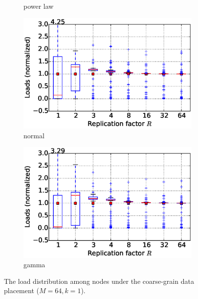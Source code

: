 \begin{figure}[!htbp]
\begin{subfigure}[b]{0.45\textwidth}
    \caption{power law}
\end{subfigure}
\begin{subfigure}[b]{0.45\textwidth}
    \includegraphics[width=\linewidth]{figures/E45_simulation_imbalance_coarse_std_normal.eps}
    \caption{normal}
\end{subfigure}
\begin{subfigure}[b]{0.45\textwidth}
    \includegraphics[width=\linewidth]{figures/E45_simulation_imbalance_coarse_std_gamma.eps}
    \caption{gamma}
\end{subfigure}
\centering
\caption{The load distribution among nodes under the coarse-grain data placement ($M=64, k=1$).}
\label{fig:simulation_imbalance_coarse}
\end{figure}


